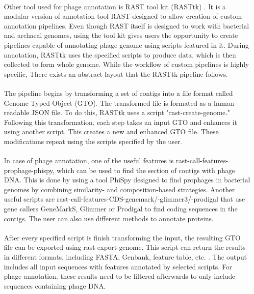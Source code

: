 \paragraph*{}
Other tool used for phage annotation is RAST tool kit (RASTtk) \cite{brettin2015rasttk}. It is a modular version of annotation tool RAST designed to allow creation of custom annotation pipelines. Even though RAST itself is designed to work with bacterial and archaeal genomes, using the tool kit gives users the opportunity to create pipelines capable of annotating phage genome using scripts featured in it. During annotation, RASTtk uses the specified scripts to produce data, which is then collected to form whole genome. While the workflow of custom pipelines is highly specific, There exists an abstract layout that the RASTtk pipeline follows.
\paragraph*{}
The pipeline begins by transforming a set of contigs into a file format called Genome Typed Object (GTO). The transformed file is formated as a human readable JSON file. To do this, RASTtk uses a script "rast-create-genome." Following this transformation, each step takes an input GTO and enhances it using another script. This creates a new and enhanced GTO file. These modifications repeat using the scripts specified by the user.
\paragraph*{}
In case of phage annotation, one of the useful features is rast-call-features-prophage-phispy, which can be used to find the section of contigs with phage DNA. This is done by using a tool PhiSpy designed to find prophages in bacterial genomes by combining similarity- and composition-based strategies. Another useful scripts are rast-call-features-CDS-genemark/-glimmer3/-prodigal that use gene callers GeneMarkS, Glimmer or Prodigal to find coding sequences in the contigs. The user can also use different methods to annotate proteins.
\paragraph*{}
After every specified script is finish transforming the input, the resulting GTO file can be exported using rast-export-genome. This script can return the results in different formats, including FASTA, Genbank, feature table, etc. \cite{brettin2015rasttk}. The output includes all input sequences with features annotated by selected scripts. For phage annotation, these results need to be filtered afterwards to only include sequences containing phage DNA.
